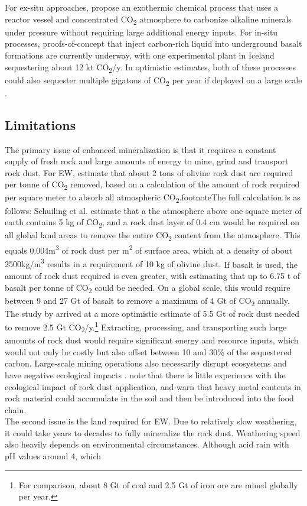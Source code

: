 For ex-situ approaches, \textcite{Lackner1997ProgressSubstrates} propose an exothermic chemical process that uses a reactor vessel and concentrated CO\textsubscript{2} atmosphere to carbonize alkaline minerals under pressure without requiring large additional energy inputs. For in-situ processes, proofs-of-concept that inject carbon-rich liquid into underground basalt formations are currently underway, with one experimental plant in Iceland sequestering about 12 kt CO\textsubscript{2}/y. In optimistic estimates, both of these processes could also sequester multiple gigatons of CO\textsubscript{2} per year if deployed on a large scale \parencite{Dipple2021TheSystems}.
\subsection*{Limitations}
The primary issue of enhanced mineralization is that it requires a constant supply of fresh rock and large amounts of energy to mine, grind and transport rock dust. For EW, \textcite{Schuiling2006EnhancedCo2} estimate that about 2 tons of olivine rock dust are required per tonne of CO\textsubscript{2} removed, based on a calculation of the amount of rock required per square meter to absorb all atmospheric CO\textsubscript{2}.footnote{The full calculation is as follows: Schuiling et al. estimate that a the atmosphere above one square meter of earth contains 5 kg of CO\textsubscript{2}, and a rock dust layer of 0.4 cm would be required on all global land areas to remove the entire CO\textsubscript{2} content from the atmosphere. This equals 0.004m\textsuperscript{3} of rock dust per m\textsuperscript{2} of surface area, which at a density of about 2500kg/m\textsuperscript{3} results in a requirement of 10 kg of olivine dust.} If basalt is used, the amount of rock dust required is even greater, with \textcite{Beerling2018FarmingSecurity} estimating that up to 6.75 t of basalt per tonne of CO\textsubscript{2} could be needed. On a global scale, this would require between 9 and 27 Gt of basalt to remove a maximum of 4 Gt of CO\textsubscript{2} annually. The study by \textcite{Goll2021PotentialRock} arrived at a more optimistic estimate of 5.5 Gt of rock dust needed to remove 2.5 Gt CO\textsubscript{2}/y.\footnote{For comparison, about 8 Gt of coal and 2.5 Gt of iron ore are mined globally per year.} Extracting, processing, and transporting such large amounts of rock dust would require significant energy and resource inputs, which would not only be costly but also offset between 10 and 30\% of the sequestered carbon. Large-scale mining operations also necessarily disrupt ecosystems and have negative ecological impacts \parencite{Beerling2018FarmingSecurity}. \textcite{Almaraz2022MethodsSettings} note that there is little experience with the ecological impact of rock dust application, and warn that heavy metal contents in rock material could accumulate in the soil and then be introduced into the food chain.\\The second issue is the land required for EW. Due to relatively slow weathering, it could take years to decades to fully mineralize the rock dust. Weathering speed also heavily depends on environmental circumstances. Although acid rain with pH values around 4, which 